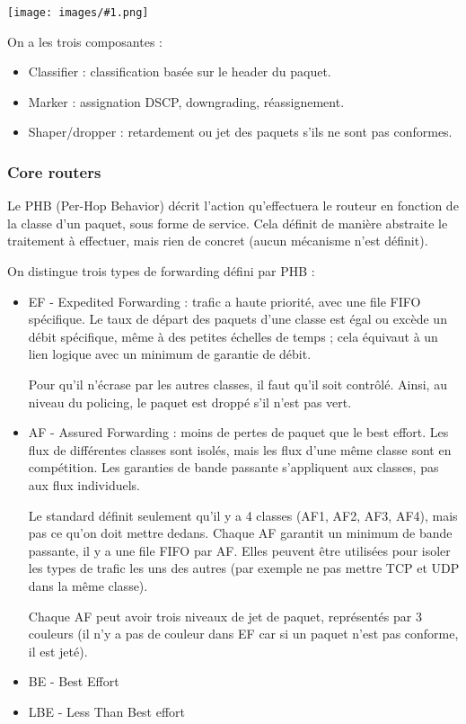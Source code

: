 \documentclass[10pt,a4paper]{report}
\newcommand{\dessin}[1]{\begin{center}\texttt{[image: images/\#1.png]}\end{center}}
\begin{document}
			\dessin{118}
			
			On a les trois composantes :
			
			\begin{itemize}
				\item Classifier : classification basée sur le header du paquet.
				\item Marker : assignation DSCP, downgrading, réassignement.
				\item Shaper/dropper : retardement ou jet des paquets s'ils ne sont pas conformes.
			\end{itemize}
		

		
		 
		
			\subsubsection{Core routers}
			
			Le PHB (Per-Hop Behavior) décrit l'action qu'effectuera le routeur en fonction de la classe d'un paquet, sous forme de service. Cela définit de manière abstraite le traitement à effectuer, mais rien de concret (aucun mécanisme n'est définit).
			
			On distingue trois types de forwarding défini par PHB :
			
			\begin{itemize}
				\item EF - Expedited Forwarding : trafic a haute priorité, avec une file FIFO spécifique. Le taux de départ des paquets d'une classe est égal ou excède un débit spécifique, même à des petites échelles de temps ; cela équivaut à un lien logique avec un minimum de garantie de débit.
				
				Pour qu'il n'écrase par les autres classes, il faut qu'il soit contrôlé. Ainsi, au niveau du policing, le paquet est droppé s'il n'est pas vert.
				
				\item AF - Assured Forwarding : moins de pertes de paquet que le best effort. Les flux de différentes classes sont isolés, mais les flux d'une même classe sont en compétition. Les garanties de bande passante s'appliquent aux classes, pas aux flux individuels.
				
				Le standard définit seulement qu'il y a 4 classes (AF1, AF2, AF3, AF4), mais pas ce qu'on doit mettre dedans. Chaque AF garantit un minimum de bande passante, il y a une file FIFO par AF. Elles peuvent être utilisées pour isoler les types de trafic les uns des autres (par exemple ne pas mettre TCP et UDP dans la même classe).
				
				Chaque AF peut avoir trois niveaux de jet de paquet, représentés par 3 couleurs (il n'y a pas de couleur dans EF car si un paquet n'est pas conforme, il est jeté).
				\item BE - Best Effort
				\item LBE - Less Than Best effort
			\end{itemize}
			
\end{document}
